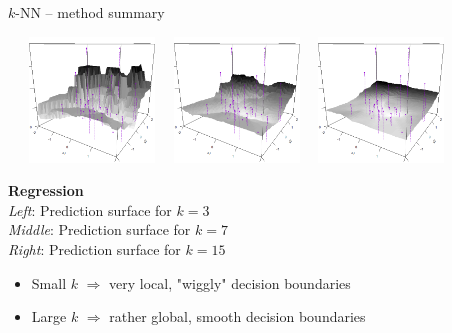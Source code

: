 \documentclass[11pt,compress,t,notes=noshow, xcolor=table]{beamer}
\begin{document}
\begin{frame2} {$k$-NN -- method summary}
  \begin{minipage}{0.7\textwidth}
  \, \, \, \includegraphics[width=0.25\textwidth]{figure/knn-reg-3d-3.png} \, \,
  \includegraphics[width=0.25\textwidth]{figure/knn-reg-3d-7.png} \, \,
  \includegraphics[width=0.25\textwidth]{figure/knn-reg-3d-15.png}
  \end{minipage}%
  \hfill
  \begin{minipage}{0.25\textwidth}
    \tiny
    \raggedright
    \textbf{Regression} \\
    \textit{Left}: Prediction surface for $k = 3$\\ 
    \textit{Middle}: Prediction surface for $k = 7$\\
    \textit{Right}: Prediction surface for $k = 15$
  \end{minipage}

  \medskip

  \begin{itemize}
      \item Small $k$ $\Rightarrow$ very local, "wiggly" decision boundaries
      \item Large $k$ $\Rightarrow$ rather global, smooth decision boundaries
  \end{itemize}

\end{frame2}
\end{document}
